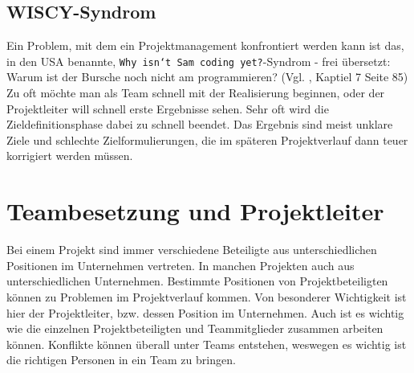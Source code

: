 \documentclass[11pt]{scrartcl}
\begin{document}
\subsection{WISCY-Syndrom}
\label{wiscy_syndrom}
Ein Problem, mit dem ein Projektmanagement konfrontiert werden kann ist das, in den USA benannte, \texttt{Why isn`t Sam coding yet?}-Syndrom - frei übersetzt: Warum ist der Bursche noch nicht am programmieren? (Vgl. \cite{proj_zum_erfolg_fuehren}, Kaptiel 7 Seite 85) \\
Zu oft möchte man als Team schnell mit der Realisierung beginnen, oder der Projektleiter will schnell erste Ergebnisse sehen. Sehr oft wird die Zieldefinitionsphase dabei zu schnell beendet. Das Ergebnis sind meist unklare Ziele und schlechte Zielformulierungen, die im späteren Projektverlauf dann teuer korrigiert werden müssen.

\pagebreak
\section{Teambesetzung und Projektleiter}
Bei einem Projekt sind immer verschiedene Beteiligte aus unterschiedlichen Positionen im Unternehmen vertreten. In manchen Projekten auch aus unterschiedlichen Unternehmen. Bestimmte Positionen von Projektbeteiligten können zu Problemen im Projektverlauf kommen. Von besonderer Wichtigkeit ist hier der Projektleiter, bzw. dessen Position im Unternehmen. Auch ist es wichtig wie die einzelnen Projektbeteiligten und Teammitglieder zusammen arbeiten können. Konflikte können überall unter Teams entstehen, weswegen es wichtig ist die richtigen Personen in ein Team zu bringen. 
\end{document}
